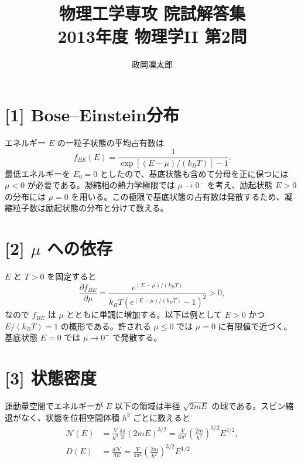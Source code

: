 \documentclass[11pt,a4paper]{article}
\title{物理工学専攻 院試解答集\\2013年度 物理学II 第2問}
\author{政岡凜太郎}
\date{}
\begin{document}
\maketitle

\section*{[1] Bose--Einstein分布}
エネルギー $E$ の一粒子状態の平均占有数は
\begin{equation}
  \boxed{f_{BE}(E)=\frac{1}{\exp[(E-\mu)/(k_BT)]-1}.}
\end{equation}
最低エネルギーを $E_0=0$ としたので、基底状態も含めて分母を正に保つには $\mu<0$ が必要である。凝縮相の熱力学極限では $\mu\to0^-$ を考え、励起状態 $E>0$ の分布には $\mu=0$ を用いる。この極限で基底状態の占有数は発散するため、凝縮粒子数は励起状態の分布と分けて数える。

\section*{[2] $\mu$ への依存}
$E$ と $T>0$ を固定すると
\begin{equation}
 \frac{\partial f_{BE}}{\partial\mu}
 =\frac{e^{(E-\mu)/(k_BT)}}{k_BT\left(e^{(E-\mu)/(k_BT)}-1\right)^2}>0,
\end{equation}
なので $f_{BE}$ は $\mu$ とともに単調に増加する。以下は例として $E>0$ かつ $E/(k_BT)=1$ の概形である。許される $\mu\le0$ では $\mu=0$ に有限値で近づく。基底状態 $E=0$ では $\mu\to0^-$ で発散する。
\begin{center}
\end{center}

\section*{[3] 状態密度}
運動量空間でエネルギーが $E$ 以下の領域は半径 $\sqrt{2mE}$ の球である。スピン縮退がなく、状態を位相空間体積 $h^3$ ごとに数えると
\begin{align}
  \mathcal N(E)
  &=\frac{V}{h^3}\frac{4\pi}{3}(2mE)^{3/2}
   =\frac{V}{6\pi^2}\left(\frac{2m}{\hbar^2}\right)^{3/2}E^{3/2},\\
  D(E)&=\frac{d\mathcal N}{dE}
   =\boxed{\frac{V}{4\pi^2}\left(\frac{2m}{\hbar^2}\right)^{3/2}E^{1/2}.}
\end{align}
\end{document}
